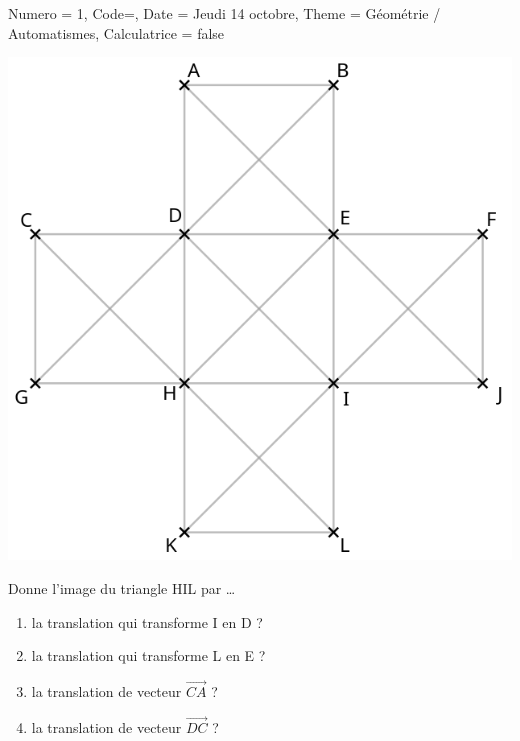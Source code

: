 \documentclass[11pt]{article}
\newcommand{\ligne}{{\color{gray!60}\hrulefill}}
\begin{document}
\begin{Maquette}[IE]{
        Numero = 1, Code={}, Date = Jeudi 14 octobre, Theme = Géométrie / Automatismes, Calculatrice = false
    }
    \vspace{.5cm}
    \begin{exercice}
        \begin{multicols}{2}
            \begin{center}
                \includegraphics[width = \linewidth]{Images/Évaluation 2 - Croix.png}
            \end{center}
            \columnbreak
            Donne l’image du triangle HIL par …
            \begin{enumerate}[itemsep=5pt]
                \item la translation qui transforme I en D ? \ligne
                \item la translation qui transforme L en E ? \ligne
                \item la translation de vecteur $\overrightarrow{CA}$ ? \ligne
                \item la translation de vecteur $\overrightarrow{DC}$ ? \ligne
            \end{enumerate}
        \end{multicols}
    \end{exercice}

    \newpage


\end{Maquette}
\end{document}
